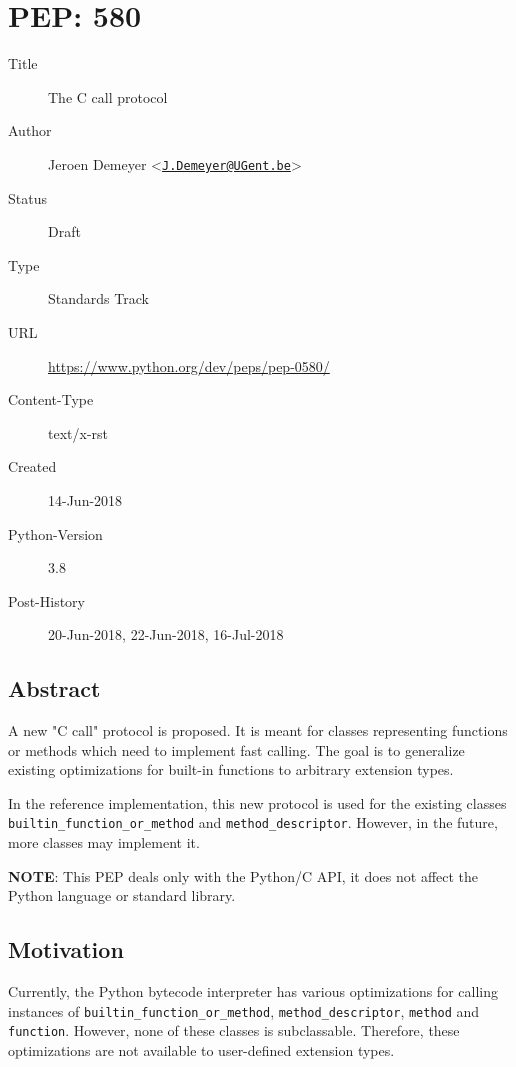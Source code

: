 \section{PEP: 580}
\label{pep580}

\begin{description}
\item[Title] The C call protocol
\item[Author] Jeroen Demeyer \textless{}\href{mailto:J.Demeyer@UGent.be}{\nolinkurl{J.Demeyer@UGent.be}}\textgreater{}
\item[Status] Draft
\item[Type] Standards Track
\item[URL] \url{https://www.python.org/dev/peps/pep-0580/}
\item[Content-Type] text/x-rst
\item[Created] 14-Jun-2018
\item[Python-Version] 3.8
\item[Post-History] 20-Jun-2018, 22-Jun-2018, 16-Jul-2018
\end{description}

\subsection{Abstract}

A new "C call" protocol is proposed. It is meant for classes
representing functions or methods which need to implement fast calling.
The goal is to generalize existing optimizations for built-in functions
to arbitrary extension types.

In the reference implementation, this new protocol is used for the
existing classes \texttt{builtin\_function\_or\_method} and
\texttt{method\_descriptor}. However, in the future, more classes may
implement it.

\textbf{NOTE}: This PEP deals only with the Python/C API, it does not
affect the Python language or standard library.

\subsection{Motivation}

Currently, the Python bytecode interpreter has various optimizations for
calling instances of \texttt{builtin\_function\_or\_method},
\texttt{method\_descriptor}, \texttt{method} and \texttt{function}.
However, none of these classes is subclassable. Therefore, these
optimizations are not available to user-defined extension types.

